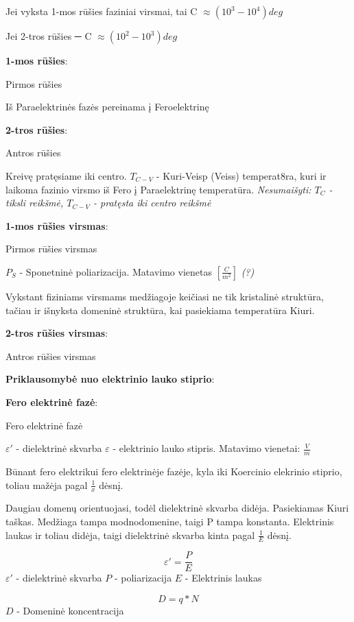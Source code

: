 Jei vyksta 1-mos rūšies faziniai virsmai,
tai C $\approx (10^3 - 10^4) deg$

Jei 2-tros rūšies ─ C $\approx (10^2 - 10^3) deg$

\textbf{1-mos rūšies}:

{Pirmos rūšies}

Iš Paraelektrinės fazės pereinama į Feroelektrinę

\textbf{2-tros rūšies}:

{Antros rūšies}

Kreivę pratęsiame iki centro.
$T_{C-V}$ - Kuri-Veisp (Veiss) temperat8ra, kuri ir laikoma fazinio virsmo
iš Fero į Paraelektrinę temperatūra.
\textit{Nesumaišyti: $T_C$ - tiksli reikšmė, $T_{C-V}$ - pratęsta iki centro reikšmė}

\textbf{1-mos rūšies virsmas}:

{Pirmos rūšies virsmas}

$P_S$ - Sponetninė poliarizacija. Matavimo vienetas $[\frac{C}{m^2}]$ \textit{(?)}

Vykstant fiziniams virsmams medžiagoje keičiasi ne tik kristalinė struktūra,
tačiau ir išnyksta domeninė struktūra, kai pasiekiama temperatūra Kiuri.

\textbf{2-tros rūšies virsmas}:

{Antros rūšies virsmas}

\textbf{Priklausomybė nuo elektrinio lauko stiprio}:

\textbf{Fero elektrinė fazė}:

{Fero elektrinė fazė}

$\varepsilon'$ - dielektrinė skvarba
$\varepsilon$ - elektrinio lauko stipris. Matavimo vienetai: $\frac{V}{m}$

Būnant fero elektrikui fero elektrinėje fazėje, kyla iki Koercinio elekrinio stiprio,
toliau mažėja pagal $\frac{1}{x}$ dėsnį.

Daugiau domenų orientuojasi, todėl dielektrinė skvarba didėja.
Pasiekiamas Kiuri taškas. Medžiaga tampa modnodomenine, taigi P tampa konstanta.
Elektrinis laukas ir toliau didėja, taigi dielektrinė skvarba kinta pagal $\frac{1}{E}$
dėsnį.

\begin{equation*}
  \varepsilon' = \frac{P}{E} 
\end{equation*}
$\varepsilon'$ - dielektrinė skvarba
$P$ - poliarizacija
$E$ - Elektrinis laukas

\begin{equation*}
  D = q * N
\end{equation*}
$D$ - Domeninė koncentracija

